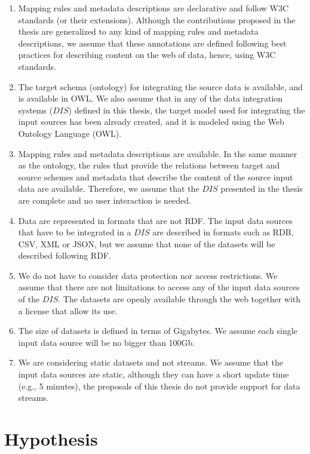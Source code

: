 \begin{enumerate}[label=\textbf{A{\arabic*}}]
    \item Mapping rules and metadata descriptions are declarative and follow W3C standards (or their extensions). Although the contributions proposed in the thesis are generalized to any kind of mapping rules and metadata descriptions, we assume that these annotations are defined following best practices for describing content on the web of data, hence, using W3C standards. 
    \item The target schema (ontology) for integrating the source data is available, and is available in OWL. We also assume that in any of the data integration systems ($DIS$) defined in this thesis, the target model used for integrating the input sources has been already created, and it is modeled using the Web Ontology Language (OWL).
    \item Mapping rules and metadata descriptions are available. In the same manner as the ontology, the rules that provide the relations between target and source schemes and metadata that describe the content of the source input data are available. Therefore, we assume that the $DIS$ presented in the thesis are complete and no user interaction is needed.
    \item Data are represented in formats that are not RDF. The input data sources that have to be integrated in a $DIS$ are described in formats such as RDB, CSV, XML or JSON, but we assume that none of the datasets will be described following RDF.
    \item We do not have to consider data protection nor access restrictions. We assume that there are not limitations to access any of the input data sources of the $DIS$. The datasets are openly available through the web together with a license that allow its use.
    \item The size of datasets is defined in terms of Gigabytes. We assume each single input data source will be no bigger than 100Gb.
    \item We are considering static datasets and not streams. We assume that the input data sources are static, although they can have a short update time (e.g., 5 minutes), the proposals of this thesis do not provide support for data streams.
\end{enumerate}

\section{Hypothesis}

